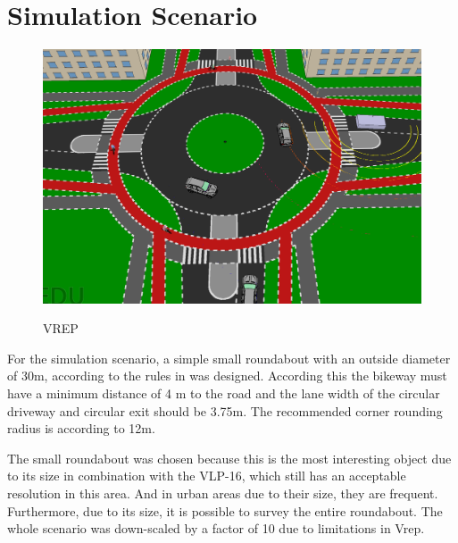 \documentclass[11pt,oneside,openright]{mpreport}
\begin{document}
\section{Simulation Scenario}

\begin{figure}[!ht]
\caption{VREP}
\includegraphics[width=\textwidth]{bilder/scenario.png}
\label{vrep}
\end{figure}



For the simulation scenario, a simple small roundabout with an outside diameter of 30m, according to the rules in \cite{man06} was designed. According this the bikeway must have a minimum distance of 4 m to the road and
the lane width of the circular driveway and circular exit should be 3.75m. The recommended corner rounding radius is according to \cite{man06} 12m.

The small roundabout was chosen because this is the most interesting object due to its size in combination with the VLP-16, which still has an acceptable resolution in this area.
And in urban areas due to their size, they are frequent. Furthermore, due to its size, it is possible to survey the entire roundabout. The whole scenario was down-scaled by a factor of 10 due to limitations in Vrep.
\end{document}
